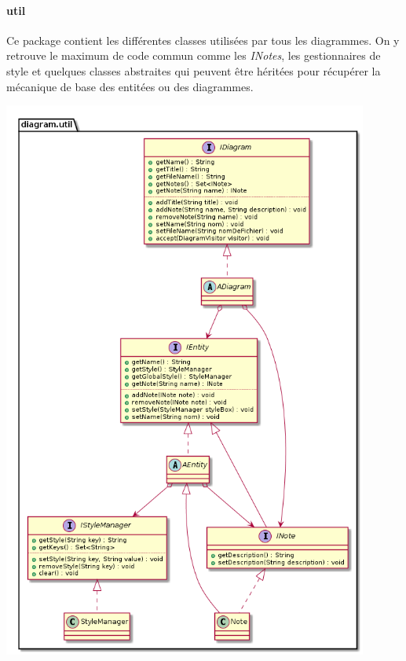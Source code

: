 \documentclass[a4paper,10pt]{article}
\begin{document}
	\paragraph{util}
	Ce package contient les différentes classes utilisées par tous les diagrammes. 
	On y retrouve le maximum de code commun comme les \emph{INotes}, les gestionnaires de style et quelques classes abstraites qui peuvent être héritées pour récupérer la mécanique de base des entitées ou des diagrammes. 
	\begin{center}
	  \includegraphics[width=12cm]{Image/util.png}
	\end{center}
	
	\newpage
\end{document}
